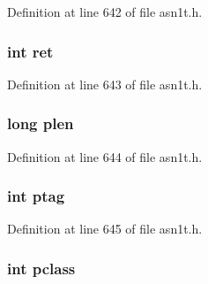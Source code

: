 Definition at line 642 of file asn1t.\+h.

\subsubsection[{\texorpdfstring{ret}{ret}}]{\setlength{\rightskip}{0pt plus 5cm}int ret}\hypertarget{struct_a_s_n1___t_l_c__st_a6baa346e44f4c2158d2be4f9b77b8203}{}\label{struct_a_s_n1___t_l_c__st_a6baa346e44f4c2158d2be4f9b77b8203}


Definition at line 643 of file asn1t.\+h.

\subsubsection[{\texorpdfstring{plen}{plen}}]{\setlength{\rightskip}{0pt plus 5cm}long plen}\hypertarget{struct_a_s_n1___t_l_c__st_ab2fd72729381cab9387cd94409b968b3}{}\label{struct_a_s_n1___t_l_c__st_ab2fd72729381cab9387cd94409b968b3}


Definition at line 644 of file asn1t.\+h.

\subsubsection[{\texorpdfstring{ptag}{ptag}}]{\setlength{\rightskip}{0pt plus 5cm}int ptag}\hypertarget{struct_a_s_n1___t_l_c__st_a3301821ad40eb17022e486accba6838d}{}\label{struct_a_s_n1___t_l_c__st_a3301821ad40eb17022e486accba6838d}


Definition at line 645 of file asn1t.\+h.

\subsubsection[{\texorpdfstring{pclass}{pclass}}]{\setlength{\rightskip}{0pt plus 5cm}int pclass}\hypertarget{struct_a_s_n1___t_l_c__st_ad65ce99c604a1e8cc10dcaed2c61d611}{}\label{struct_a_s_n1___t_l_c__st_ad65ce99c604a1e8cc10dcaed2c61d611}


